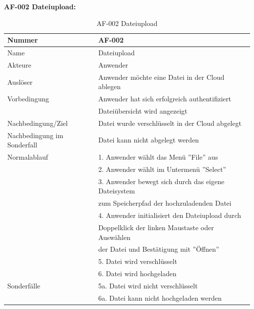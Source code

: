 \documentclass[12pt,a4paper,bibliography=totocnumbered,listof=totocnumbered]{scrartcl}
\begin{document}
\textbf{AF-002 Dateiupload:}
\begin{table}[!h]
	\centering
	\begin{tabular}{|l|l|}
		\hline
		Nummer & AF-002\\
		\hline
		Name & Dateiupload\\
		\hline
		Akteure & Anwender\\
		\hline
		Auslöser & Anwender möchte eine Datei in der Cloud ablegen\\
		\hline
		Vorbedingung & Anwender hat sich erfolgreich authentifiziert \\ & Dateiübersicht wird angezeigt\\
		\hline
		Nachbedingung/Ziel & Datei wurde verschlüsselt in der Cloud abgelegt \\
		\hline
		Nachbedingung im Sonderfall & Datei kann nicht abgelegt werden\\
		\hline
		Normalablauf & 1. Anwender wählt das Menü ''File'' aus \\ & 2. Anwender wählt im Untermenü ''Select'' \\ & 3. Anwender bewegt sich durch das eigene Dateisystem \\ & zum 				Speicherpfad der hochzuladenden Datei \\ & 4. Anwender initialisiert den Dateiupload durch \\ &  Doppelklick der linken Maustaste oder Auswählen \\ & der Datei und Bestätigung                  mit ''Öffnen'' \\  & 5. Datei wird verschlüsselt \\ & 6. Datei wird hochgeladen \\
		\hline
		Sonderfälle & 5a. Datei wird nicht verschlüsselt \\ & 6a. Datei kann nicht hochgeladen werden\\
		\hline
	\end{tabular}
	\caption{AF-002 Dateiupload}
	\label{tab:AF-002 Dateiupload}
\end{table}
\pagebreak
\end{document}
